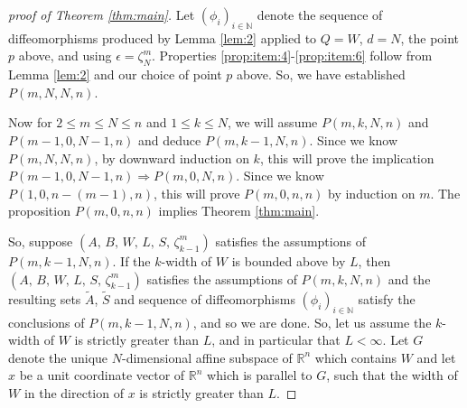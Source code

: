 \documentclass[10pt]{amsart}
\theoremstyle{definition}
\theoremstyle{definition}
\theoremstyle{definition}
\theoremstyle{definition}
\theoremstyle{definition}
\theoremstyle{definition}
\theoremstyle{definition}
\newcommand{\R}{\ensuremath{\mathbb{R}}}
\newcommand{\N}{\ensuremath{\mathbb{N}}}
\newcommand{\<}{\langle}
\renewcommand{\>}{\rangle}
\def\i{\infty}
\def\e{\epsilon}
\begin{document}
\begin{proof}[proof of Theorem \ref{thm:main}]
	Let \( (\phi_i)_{i\in \N} \) denote the sequence of diffeomorphisms produced by Lemma \ref{lem:2} applied to \( Q=W \), \( d=N \), the point \( p \) above, and using \( \e=\zeta^m_N \). Properties \ref{prop:item:4}-\ref{prop:item:6} follow from Lemma \ref{lem:2} and our choice of point \( p \) above. So, we have established \( P(m,N,N,n) \).
	
	Now for \( 2\leq m \leq N \leq n \) and \( 1\leq k\leq N \), we will assume \( P(m,k,N,n) \) and \( P(m-1,0,N-1,n) \) and deduce \( P(m,k-1,N,n) \). Since we know \( P(m,N,N,n) \), by downward induction on \( k \), this will prove the implication \( P(m-1,0,N-1,n) \Rightarrow P(m,0,N,n) \). Since we know \( P(1,0,n-(m-1),n) \), this will prove \( P(m,0,n,n) \) by induction on \( m \). The proposition \( P(m,0,n,n) \) implies Theorem \ref{thm:main}.

	So, suppose \( (A,\, B,\, W,\, L,\, S,\, \zeta^m_{k-1}) \) satisfies the assumptions of \( P(m,k-1,N,n) \). If the \( k \)-width of \( W \) is bounded above by \( L \), then \( (A,\, B,\, W,\, L,\, S,\, \zeta^m_{k-1}) \) satisfies the assumptions of \( P(m,k,N,n) \) and the resulting sets \( \tilde{A} \), \( \tilde{S} \) and sequence of diffeomorphisms \( (\phi_i)_{i\in \N} \) satisfy the conclusions of \( P(m,k-1,N,n) \), and so we are done. So, let us assume the \( k \)-width of \( W \) is strictly greater than \( L \), and in particular that \( L<\i \). Let \( G \) denote the unique \( N \)-dimensional affine subspace of \( \R^n \) which contains \( W \) and let \( x \) be a unit coordinate vector of \( \R^n \) which is parallel to \( G \), such that the width of \( W \) in the direction of \( x \) is strictly greater than \( L \). 
	

\end{proof}
\end{document}
